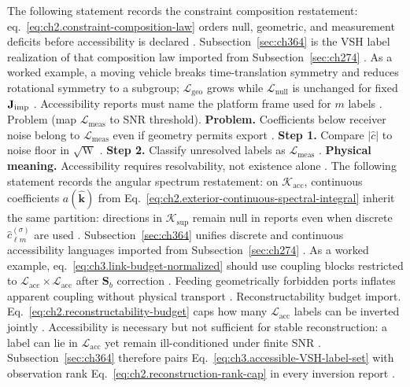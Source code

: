 The following statement records the constraint composition restatement: eq.~\eqref{eq:ch2.constraint-composition-law} orders null, geometric, and measurement deficits before accessibility is
declared \cite{harrington2001}. Subsection~\ref{sec:ch364} is the VSH label realization of that composition
law imported from Subsection~\ref{sec:ch274} \cite{harrington2001}.
As a worked example, a moving vehicle breaks time-translation symmetry and reduces rotational symmetry to a subgroup; \(\mathcal{L}_{\mathrm{geo}}\)
grows while \(\mathcal{L}_{\mathrm{null}}\) is unchanged for fixed \(\mathbf{J}_{\mathrm{imp}}\) \cite{harrington2001}. Accessibility
reports must name the platform frame used for \(m\) labels \cite{hansen1988}.
Problem (map \(\mathcal{L}_{\mathrm{meas}}\) to SNR threshold). \textbf{Problem.} Coefficients below receiver noise belong to \(\mathcal{L}_{\mathrm{meas}}\) even if geometry permits export
\cite{harrington2001}.
\textbf{Step 1.} Compare \(|\widehat{c}|\) to noise floor in \(\sqrt{\mathrm{W}}\) \cite{harrington2001}.
\textbf{Step 2.} Classify unresolved labels as \(\mathcal{L}_{\mathrm{meas}}\) \cite{devaney2004}.
\textbf{Physical meaning.} Accessibility requires resolvability, not existence alone \cite{harrington2001}.
The following statement records the angular spectrum restatement: on \(\mathcal{K}_{\mathrm{acc}}\), continuous coefficients \(a(\widehat{\mathbf{k}})\) from
Eq.~\eqref{eq:ch2.exterior-continuous-spectral-integral} inherit the same partition: directions in
\(\mathcal{K}_{\mathrm{sup}}\) remain null in reports even when discrete \(\widehat{c}_{\ell m}^{(\sigma)}\) are used
\cite{stratton1941}. Subsection~\ref{sec:ch364} unifies discrete and continuous accessibility languages
imported from Subsection~\ref{sec:ch274} \cite{harrington2001}.
As a worked example, eq.~\eqref{eq:ch3.link-budget-normalized} should use coupling blocks restricted to
\(\mathcal{L}_{\mathrm{acc}}\times\mathcal{L}_{\mathrm{acc}}\) after \(\mathbf{S}_{b}\) correction
\cite{harrington2001}. Feeding geometrically forbidden ports inflates apparent coupling without physical
transport \cite{hansen1988}.
Reconstructability budget import. Eq.~\eqref{eq:ch2.reconstructability-budget} caps how many \(\mathcal{L}_{\mathrm{acc}}\) labels can be inverted jointly
\cite{harrington2001}. Accessibility is necessary but not sufficient for stable reconstruction: a label can
lie in \(\mathcal{L}_{\mathrm{acc}}\) yet remain ill-conditioned under finite SNR \cite{devaney2004}.
Subsection~\ref{sec:ch364} therefore pairs Eq.~\eqref{eq:ch3.accessible-VSH-label-set} with observation rank
Eq.~\eqref{eq:ch2.reconstruction-rank-cap} in every inversion report \cite{harrington2001}.
